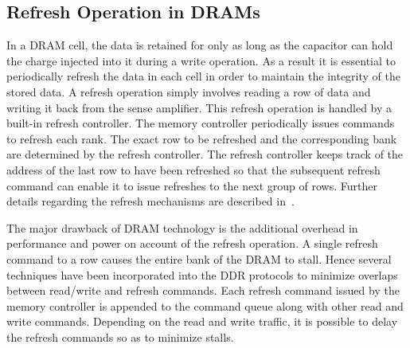 \subsection{Refresh Operation in DRAMs}
In a DRAM cell, the data is retained for only as long as the capacitor can hold the charge injected into it during a write operation. 
As a result it is essential to periodically refresh the data in each cell in order to maintain the integrity of the stored data. A refresh operation simply involves reading a row of data and writing it back from the sense amplifier. 
This refresh operation is handled by a built-in refresh controller. The memory controller periodically issues commands to refresh each rank.
The exact row to be refreshed and the corresponding bank are determined by the refresh controller. 
The refresh controller keeps track of the address of the last row to have been refreshed so that the subsequent refresh command can enable it to issue refreshes to the next group of rows.
Further details regarding the refresh mechanisms are described in~\cite{jedec-sdram-standards}.

The major drawback of DRAM technology is the additional overhead in performance and power on account of the refresh operation. A single refresh command to a row causes the entire bank of the DRAM to stall. Hence several techniques have been incorporated into the DDR protocols to minimize overlaps between read/write and refresh commands.
Each refresh command issued by the memory controller is appended to the command queue along with other read and write commands. Depending on the read and write traffic, it is possible to delay the refresh commands so as to minimize stalls. %
